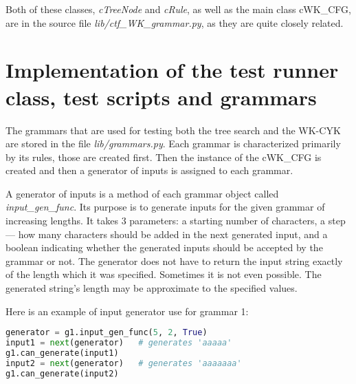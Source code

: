 Both of these classes, \textit{cTreeNode} and \textit{cRule}, as well as the main class cWK\_CFG, are in the source file \textit{lib/ctf\_WK\_grammar.py}, as they are quite closely related.


\section{Implementation of the test runner class, test scripts and grammars}
The grammars that are used for testing both the tree search and the WK-CYK are stored in the file \textit{lib/grammars.py}. Each grammar is characterized primarily by its rules, those are created first. Then the instance of the cWK\_CFG is created and then a generator of inputs is assigned to each grammar.

A generator of inputs is a method of each grammar object called \textit{input\_gen\_func}. Its purpose is to generate inputs for the given grammar of increasing lengths. It takes 3 parameters: a starting number of characters, a step --- how many characters should be added in the next generated input, and a boolean indicating whether the generated inputs should be accepted by the grammar or not. The generator does not have to return the input string exactly of the length which it was specified. Sometimes it is not even possible. The generated string's length may be approximate to the specified values.

Here is an example of input generator use for grammar 1:
\begin{lstlisting}[language=Python]
generator = g1.input_gen_func(5, 2, True)
input1 = next(generator)   # generates 'aaaaa'
g1.can_generate(input1)
input2 = next(generator)   # generates 'aaaaaaa'
g1.can_generate(input2)
\end{lstlisting}

